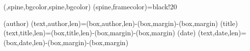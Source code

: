 ({,spine,bgcolor},{spine,bgcolor})%
                {}%
                {(spine,framecolor)={black!20}}

(author){%
  \spine(text,author,len)={\dimexpr\thespine(box,author,len)-\thespine(box,margin)-\thespine(box,margin)}
}{}
(title){%
  \spine(text,title,len)={\dimexpr\thespine(box,title,len)-\thespine(box,margin)-\thespine(box,margin)}
}{}
(date){%
  \spine(text,date,len)={\dimexpr\thespine(box,date,len)-\thespine(box,margin)-\thespine(box,margin)}
}{}


\newcommand{\@spinetextalin}[1]{%
  \raggedright%
  \IfStrEqCase{\thespine(box,#1,align)}{%
    {l}{\raggedright}%
    {c}{\centering}%
    {r}{\raggedleft}%
  }%
}

\newcommand{\@spinetextcolor}[1]{%
  \ifdatadefinedor{\arg}{spine}({box,#1,textcolor},{box,textcolor}){\color{\thespine(\arg)}}{}%
}

